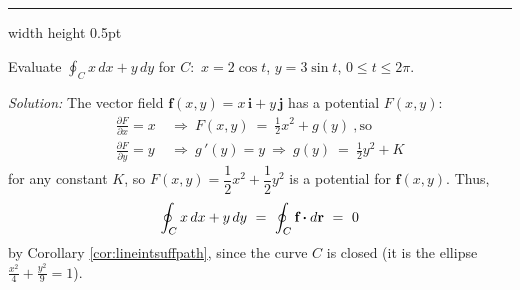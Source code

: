 
\vspace{3mm}
\hrule width \textwidth height 0.5pt
\begin{exmp}
 Evaluate $\displaystyle\oint_C x\,dx + y\,dy$ for $C:$ $x=2\cos t$, $y=3\sin t$,
 $0\le t\le 2\pi$.\vspace{1mm}
 \par\noindent \emph{Solution:} The vector field $\textbf{f}(x,y) = x\,\textbf{i} + y\,\textbf{j}$ has a
 potential $F(x,y)$:
 \begin{align*}
  \frac{\partial F}{\partial x} = x ~&\Rightarrow~ F(x,y) ~=~ \frac{1}{2}x^2 + g(y) ~,\text{so}\\
  \frac{\partial F}{\partial y} = y ~&\Rightarrow~ g\,'(y) = y ~\Rightarrow~ g(y) ~=~ \frac{1}{2}y^2 + K
 \end{align*}
 for any constant $K$, so $F(x,y) = \dfrac{1}{2}x^2 + \dfrac{1}{2}y^2$ is a potential for $\textbf{f}(x,y)$. Thus,
 \begin{displaymath}
  \displaystyle\oint_C x\,dx + y\,dy ~=~ \displaystyle\oint_{C} \textbf{f} \bm{\cdot} d\textbf{r} ~=~ 0
 \end{displaymath}
 by Corollary \ref{cor:lineintsuffpath}, since the curve $C$ is closed (it is the ellipse
 $\frac{x^2}{4}+\frac{y^2}{9}=1$).
\end{exmp}
\startexercises\label{sec4dot2}
